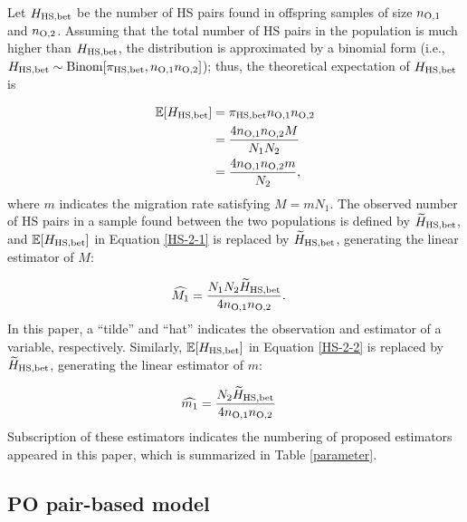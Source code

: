 \documentclass[12pt, English]{article}
\begin{document}
\begin{spacing}{1.9}
Let $H_{\rm HS,bet}$ be the number of HS pairs found in offspring samples of size $n_{\rm O, 1}$ and $n_{\rm O, 2}$. Assuming that the total number of HS pairs in the population is much higher than $H_{\rm HS,bet}$, the distribution is approximated by a binomial form (i.e., $H_{\rm HS,bet} \sim {\rm Binom}[\pi_{\rm HS,bet}, n_{\rm O, 1} n_{\rm O, 2}]$); thus, the theoretical expectation of $H_{\rm HS,bet}$ is

\begin{align}
\mathbb{E}[H_{\rm HS, bet}] &= \pi_{\rm HS,bet} n_{\rm O, 1} n_{\rm O, 2} \nonumber\\
&= \frac{ 4 n_{\rm O, 1} n_{\rm O, 2} M } { N_{1} N_{2} } \label{HS-2-1}\\
&= \frac{ 4 n_{\rm O, 1} n_{\rm O, 2} m } { N_{2} },
\label{HS-2-2}
\end{align}
where $m$ indicates the migration rate satisfying $M = mN_{1}$. The observed number of HS pairs in a sample found between the two populations is defined by $\widetilde{H}_{\rm HS, bet}$, and $\mathbb{E}[H_{\rm HS, bet}]$ in Equation \ref{HS-2-1} is replaced by $\widetilde{H}_{\rm HS, bet}$, generating the linear estimator of $M$:

\begin{align}
\widehat{M_1} &= \frac{N_{1} N_{2} \widetilde{H}_{\rm HS, bet} } {4 n_{\rm O, 1} n_{\rm O, 2} }.
\label{HS-3}
\end{align}
In this paper, a ``tilde'' and ``hat'' indicates the observation and estimator of a variable, respectively. Similarly, $\mathbb{E}[H_{\rm HS, bet}]$ in Equation \ref{HS-2-2} is replaced by $\widetilde{H}_{\rm HS, bet}$, generating the linear estimator of $m$:

\begin{align}
\widehat{m_1} &= \frac{N_{2} \widetilde{H}_{\rm HS, bet} } {4 n_{\rm O, 1} n_{\rm O, 2} }
\label{HS-4}
\end{align}
Subscription of these estimators indicates the numbering of proposed estimators appeared in this paper, which is summarized in Table \ref{parameter}. 

\begin{center}
\end{center}

\subsection{PO pair-based model}


\end{spacing}
\end{document}
